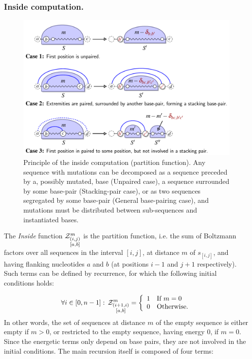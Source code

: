 \subsubsection{Inside computation.}
\begin{figure}[t]\centering
\includegraphics[scale=\ScaleDP]{FigDPInsideWrapper}
\caption{Principle of the inside computation (partition function). Any sequence with mutations  
can be decomposed as a sequence preceded by a, possibly mutated, base 
(Unpaired case), a sequence surrounded by some base-pair (Stacking-pair case), 
or as two sequences segregated by some base-pair (General base-pairing case), and mutations must be distributed between sub-sequences 
and instantiated bases.}
\end{figure}

The \emph{Inside} function $\Z{i,j}{m}{a,b}$ is the partition function, i.e. the sum of Boltzmann factors over all sequences in the interval $[i,j]$, at distance $m$ of $s_{[i,j]}$, and having flanking nucleotides $a$ and $b$ (at positions $i-1$ and $j+1$ respectively). 
Such terms can be defined by recurrence, for which the following initial conditions holds:

\begin{equation}
	\forall i \in [0,n-1]:\, \Z{i+1,i}{m}{a,b}=\left\{
	\begin{array}{ll}
		1 &\text{If } m = 0\\
		0 &\text{Otherwise.}
	\end{array}\right.
\label{eq:Z_in}
\end{equation}
In other words, the set of sequences at distance $m$ of the empty sequence is either empty if $m>0$, or restricted to the empty sequence, having energy $0$, if $m=0$. Since the energetic terms only depend on base pairs, they are not involved in the initial conditions. 
The main recursion itself is composed of four terms:\\


